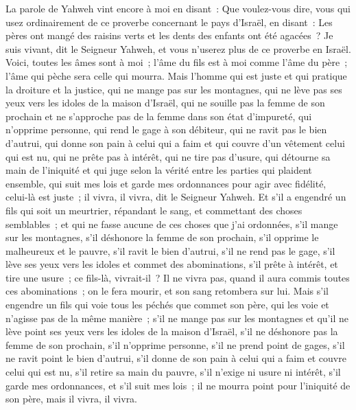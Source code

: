 \begin{multicols}{2}
\VerseOne{}La parole de Yahweh vint encore à moi en disant~:
Que voulez-vous dire, vous qui usez ordinairement de ce proverbe concernant le pays d'Israël, en disant~: Les pères ont mangé des raisins verts et les dents des enfants ont été agacées~?
Je suis vivant, dit le Seigneur Yahweh, et vous n'userez plus de ce proverbe en Israël.
Voici, toutes les âmes sont à moi~; l'âme du fils est à moi comme l'âme du père~; l'âme qui pèche sera celle qui mourra.
Mais l'homme qui est juste et qui pratique la droiture et la justice,
qui ne mange pas sur les montagnes, qui ne lève pas ses yeux vers les idoles de la maison d'Israël, qui ne souille pas la femme de son prochain et ne s'approche pas de la femme dans son état d'impureté,
qui n'opprime personne, qui rend le gage à son débiteur, qui ne ravit pas le bien d'autrui, qui donne son pain à celui qui a faim et qui couvre d'un vêtement celui qui est nu,
qui ne prête pas à intérêt, qui ne tire pas d'usure, qui détourne sa main de l'iniquité et qui juge selon la vérité entre les parties qui plaident ensemble,
qui suit mes lois et garde mes ordonnances pour agir avec fidélité, celui-là est juste~; il vivra, il vivra, dit le Seigneur Yahweh.
Et s'il a engendré un fils qui soit un meurtrier, répandant le sang, et commettant des choses semblables~;
et qui ne fasse aucune de ces choses que j'ai ordonnées, s'il mange sur les montagnes, s'il déshonore la femme de son prochain,
s'il opprime le malheureux et le pauvre, s'il ravit le bien d'autrui, s'il ne rend pas le gage, s'il lève ses yeux vers les idoles et commet des abominations,
s'il prête à intérêt, et tire une usure~; ce fils-là, vivrait-il~? Il ne vivra pas, quand il aura commis toutes ces abominations~; on le fera mourir, et son sang retombera sur lui.
Mais s'il engendre un fils qui voie tous les péchés que commet son père, qui les voie et n'agisse pas de la même manière~;
s'il ne mange pas sur les montagnes et qu'il ne lève point ses yeux vers les idoles de la maison d'Israël, s'il ne déshonore pas la femme de son prochain,
s'il n'opprime personne, s'il ne prend point de gages, s'il ne ravit point le bien d'autrui, s'il donne de son pain à celui qui a faim et couvre celui qui est nu,
s'il retire sa main du pauvre, s'il n'exige ni usure ni intérêt, s'il garde mes ordonnances, et s'il suit mes lois~; il ne mourra point pour l'iniquité de son père, mais il vivra, il vivra.

\end{multicols}

